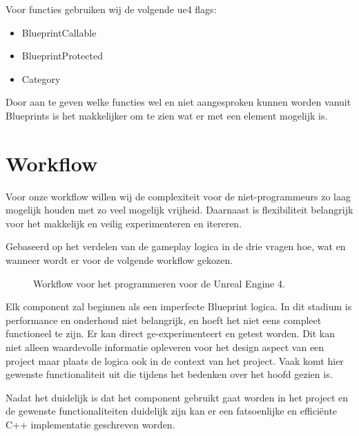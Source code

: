 Voor functies gebruiken wij de volgende \gls{ue4} flags:

\begin{itemize}
	\item BlueprintCallable
	\item BlueprintProtected
	\item Category
\end{itemize}

Door aan te geven welke functies wel en niet aangesproken kunnen worden vanuit Blueprints is het makkelijker om te zien wat er met een element mogelijk is.

\section{Workflow}
Voor onze workflow willen wij de complexiteit voor de niet-programmeurs zo laag mogelijk houden met zo veel mogelijk vrijheid. Daarnaast is flexibiliteit belangrijk voor het makkelijk en veilig experimenteren en itereren.

Gebaseerd op het verdelen van de gameplay logica in de drie vragen hoe, wat en wanneer wordt er voor de volgende workflow gekozen.
    
\begin{figure}[H]
	\centering
	\caption{Workflow voor het programmeren voor de Unreal Engine 4.}
	\label{fig:workflow}
\end{figure}

Elk component zal beginnen als een imperfecte Blueprint logica. In dit stadium is performance en onderhoud niet belangrijk, en hoeft het niet eens compleet functioneel te zijn. Er kan direct ge-experimenteert en getest worden. Dit kan niet alleen waardevolle informatie opleveren voor het design aspect van een project maar plaats de logica ook in de context van het project. Vaak komt hier gewenste functionaliteit uit die tijdens het bedenken over het hoofd gezien is.

Nadat het duidelijk is dat het component gebruikt gaat worden in het project en de gewenste functionaliteiten duidelijk zijn kan er een fatsoenlijke en efficiënte C++ implementatie geschreven worden.

